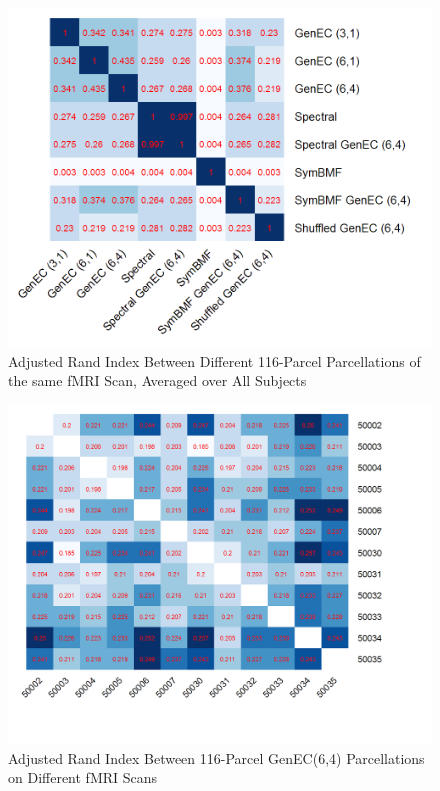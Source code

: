 \begin{figure}
\caption{Adjusted Rand Index Between Different 116-Parcel %
Parcellations of the same fMRI Scan, Averaged over All Subjects}
\label{ari_same}
\includegraphics[scale = 1]{figs/8_ari_same.png}
\end{figure}

\begin{figure}
\caption{Adjusted Rand Index Between 116-Parcel GenEC(6,4)
Parcellations on Different fMRI Scans}
\label{ari_diff}
\includegraphics[scale = 0.95]{figs/8_ari_diff.png}
\end{figure}

